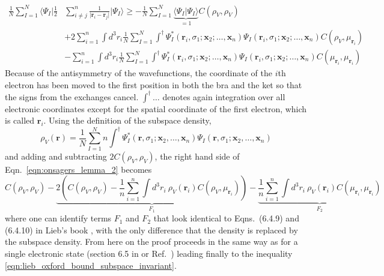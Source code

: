 \documentclass[journal=jpca,manuscript=article,layout=singlecolumn]{achemso}
\renewcommand\vec[1]{\mathbf{#1}}
\begin{document}
\begin{equation}
\begin{split}
\frac{1}{N} \sum_{I=1}^N \langle \Psi_I \vert \frac{1}{2} & \sum_{i \neq j}^n \frac{1}{\vert \vec{r}_i - \vec{r}_j \vert} \vert \Psi_I \rangle
\geq
-\frac{1}{N} \sum_{I=1}^{N} \underbrace{\langle \Psi_I \vert \Psi_I \rangle}_{=1} C(\rho_V, \rho_V) \\
& + 2 \sum_{i=1}^n \int d^3r_i 
\frac{1}{N} \sum_{I=1}^{N} \int^{\dagger} \Psi_I^*(\vec{r}_i,\sigma_1;\vec{x}_2;\ldots,\vec{x}_n)
\Psi_I(\vec{r}_i,\sigma_1;\vec{x}_2;\ldots,\vec{x}_n)
C(\rho_V,\mu_{\vec{r}_i})
\\
& - \sum_{i=1}^n \int d^3r_i
\frac{1}{N} \sum_{I=1}^{N} \int^{\dagger} \Psi_I^*(\vec{r}_i,\sigma_1;\vec{x}_2;\ldots,\vec{x}_n)
\Psi_I(\vec{r}_i,\sigma_1;\vec{x}_2;\ldots,\vec{x}_n)
C(\mu_{\vec{r}_i},\mu_{\vec{r}_i}) \label{eqn:onsagers_lemma_2}
\end{split}
\end{equation}
Because of the antisymmetry of the wavefunctions, the coordinate of the $i$th electron has been moved to the first position in both the bra
and the ket so that the signs from the exchanges cancel. $\int^{\dagger}\ldots$ denotes again integration over all electronic coordinates except
for the spatial coordinate of the first electron, which is called $\vec{r}_i$. 
Using the definition of the subspace density,
\begin{equation}
 \rho_V(\vec{r}) = \frac{1}{N} \sum_{I=1}^{N} n \int^{\dagger}
 \Psi_I^*(\vec{r},\sigma_1;\vec{x}_2,\ldots,\vec{x}_n) \Psi_I(\vec{r},\sigma_1;\vec{x}_2,\ldots,\vec{x}_n)
\end{equation}
and adding and subtracting $2 C(\rho_V,\rho_V)$, the right hand side of Eqn.~\ref{eqn:onsagers_lemma_2}
becomes
\begin{equation}
 C(\rho_V,\rho_V) 
  - \underbrace{2 \left( 
    C(\rho_V,\rho_V) - \frac{1}{n} \sum_{i=1}^{n} \int d^3r_i ~ \rho_V(\vec{r}_i) C(\rho_V,\mu_{\vec{r}_i})
    \right)}_{F_1}
  - \underbrace{\frac{1}{n} \sum_{i=1}^{n} \int d^3r_i ~ \rho_V(\vec{r}_i) C(\mu_{\vec{r}_i},\mu_{\vec{r}_i})}_{F_2}
\end{equation}
where one can identify terms $F_1$ and $F_2$ that look identical to
Eqns.~(6.4.9) and (6.4.10) in Lieb's book \cite{Lieb2010_Stability_of_Matter},
with the only difference that the density is replaced by the subspace density.
From here on the proof proceeds in the same way as for a single electronic state (section 6.5 in \cite{Lieb2010_Stability_of_Matter}
or Ref.~\cite{Lieb1981}) leading finally to the inequality \ref{eqn:lieb_oxford_bound_subspace_invariant}.
\FloatBarrier



\end{document}
